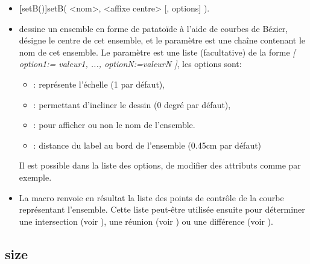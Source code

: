 \begin{itemize}
 \item \util \textbf[setB()]{setB( <nom>, <affixe centre> [, options] )}.
 \item \desc dessine un ensemble en forme de patatoïde à l'aide de courbes de Bézier,  désigne le centre de cet ensemble, et le paramètre  est une chaîne contenant le nom de cet ensemble. Le paramètre  est une liste (facultative) de la forme \textsl{[ option1:= valeur1, ..., optionN:=valeurN ]}, les options sont:

  \begin{itemize}
  \item {}: représente l'échelle (1 par défaut),
  \item {}: permettant d'incliner le dessin (0 degré par défaut),
  \item {}: pour afficher ou non le nom de l'ensemble.
  \item {}: distance du label au bord de l'ensemble (0.45cm par défaut)
  \end{itemize}
Il est possible dans la liste des options, de modifier des attributs comme  par exemple.
 \item La macro renvoie en résultat la liste des points de contrôle de la courbe représentant l'ensemble. Cette liste peut-être utilisée ensuite pour déterminer une intersection (voir ), une réunion (voir ) ou une différence (voir ).
\end{itemize}


\subsection{size}\label{macsize}

